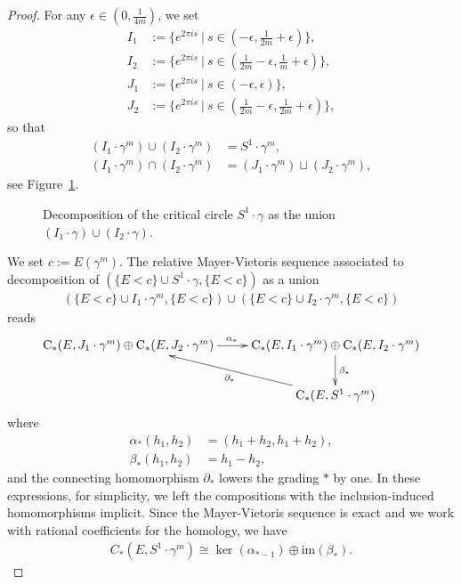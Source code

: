 \documentclass[reqno]{amsart}
\numberwithin{equation}{section}
\theoremstyle{personal}%
\theoremstyle{definition}
\newcommand{\Loc}{\mathrm{C}}
\begin{document}
\begin{proof}
For any $\epsilon\in(0,\tfrac 1{4m})$, we set
\begin{align*}
I_1 & :=\big\{ e^{2\pi i s}\ \big|\ s\in(-\epsilon,\tfrac1{2m}+\epsilon)  \big\},\\
I_2 & :=\big\{ e^{2\pi i s}\ \big|\ s\in(\tfrac1{2m}-\epsilon,\tfrac1m+\epsilon)  \big\},\\
J_1 & :=\big\{ e^{2\pi i s}\ \big|\ s\in(-\epsilon,\epsilon)  \big\},\\
J_2 & :=\big\{ e^{2\pi i s}\ \big|\ s\in(\tfrac1{2m}-\epsilon,\tfrac1{2m}+\epsilon)  \big\},
\end{align*}
so that 
\begin{align*}
 (I_1\cdot\gamma^m) \cup (I_2\cdot\gamma^m) & = S^1\cdot\gamma^m,\\
 (I_1\cdot\gamma^m) \cap (I_2\cdot\gamma^m) & =(J_1\cdot\gamma^m)\sqcup(J_2\cdot\gamma^m),
\end{align*}
see Figure~\ref{f:circle}. 
\begin{figure}
\begin{center}
\begin{footnotesize}
 
\end{footnotesize}
\begin{small}
\caption{Decomposition of the critical circle $S^1\cdot\gamma$ as the union $(I_1\cdot\gamma)\cup (I_2\cdot\gamma)$.}
\label{f:circle}
\end{small}
\end{center}
\end{figure}%
We set $c:=E(\gamma^m)$. The relative Mayer-Vietoris sequence associated to decomposition of $(\{E<c\}\cup S^1\cdot\gamma,\{E<c\})$ as a union
\begin{align*}
(\{E<c\}\cup I_1\cdot\gamma^m,\{E<c\}) 
\cup
(\{E<c\}\cup I_2\cdot\gamma^m,\{E<c\}) 
\end{align*}
reads
\begin{align*}
\xymatrix{
\Loc_*(E,J_1\cdot\gamma^m) \oplus \Loc_*(E,J_2\cdot\gamma^m)
\ar[r]^{\alpha_*}
&
\Loc_*(E,I_1\cdot\gamma^m) \oplus \Loc_*(E,I_2\cdot\gamma^m)
\ar[d]^{\beta_*}
\\
&\Loc_*(E,S^1\cdot\gamma^m)
\ar[ul]^{\partial_*}
} 
\end{align*}
where
\begin{align*}
\alpha_*(h_1,h_2)&=(h_1+h_2,h_1+h_2) ,\\
\beta_*(h_1, h_2)&=h_1-h_2,
\end{align*}
and the connecting homomorphism $\partial_*$ lowers the grading $*$ by one. In these expressions, for simplicity, we left the compositions with the inclusion-induced homomorphisms implicit. Since the Mayer-Vietoris sequence is exact and we work with rational coefficients for the homology, we have
\begin{align*}
C_*(E,S^1\cdot\gamma^m)\cong\ker(\alpha_{*-1})\oplus\textrm{im}(\beta_*).
\end{align*}



\end{proof}
\end{document}

